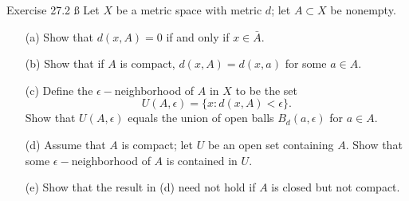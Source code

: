 \documentclass{hmwk}
\begin{document}
\begin{problem}{Exercise 27.2}
    \ss
    \noindent Let $X$ be a metric space with metric $d$; let $A \subset X$ be nonempty. 
    \begin{itemize}
        \item[(a)] Show that $d(x, A) = 0$ if and only if $x \in \bar{A}$.
        \item[(b)] Show that if $A$ is compact, $d(x, A) = d(x, a)$ for some $a \in A$. 
        \item[(c)] Define the $\epsilon-$neighborhood of $A$ in $X$ to be the set $$U(A, \epsilon) = \{x : d(x, A) < \epsilon\}.$$ Show that $U(A, \epsilon)$ equals the union of open balls $B_d(a, \epsilon)$ for $a \in A$. 
        \item[(d)] Assume that $A$ is compact; let $U$ be an open set containing $A$. Show that some $\epsilon-$neighborhood of $A$ is contained in $U$.
        \item[(e)] Show that the result in (d) need not hold if $A$ is closed but not compact. 
    \end{itemize}
\end{problem}
\end{document}
